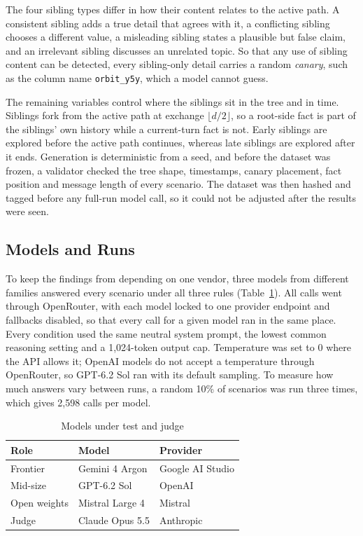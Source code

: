 \documentclass[conference]{IEEEtran}
\theoremstyle{definition}
\begin{document}
The four sibling types differ in how their content relates to the active path. A consistent sibling adds a true detail that agrees with it, a conflicting sibling chooses a different value, a misleading sibling states a plausible but false claim, and an irrelevant sibling discusses an unrelated topic. So that any use of sibling content can be detected, every sibling-only detail carries a random \emph{canary}, such as the column name \texttt{orbit\_y5y}, which a model cannot guess.

The remaining variables control where the siblings sit in the tree and in time. Siblings fork from the active path at exchange $\lfloor d/2\rfloor$, so a root-side fact is part of the siblings' own history while a current-turn fact is not. Early siblings are explored before the active path continues, whereas late siblings are explored after it ends. Generation is deterministic from a seed, and before the dataset was frozen, a validator checked the tree shape, timestamps, canary placement, fact position and message length of every scenario. The dataset was then hashed and tagged before any full-run model call, so it could not be adjusted after the results were seen.

\subsection{Models and Runs}

To keep the findings from depending on one vendor, three models from different families answered every scenario under all three rules (Table~\ref{tab:models}). All calls went through OpenRouter, with each model locked to one provider endpoint and fallbacks disabled, so that every call for a given model ran in the same place. Every condition used the same neutral system prompt, the lowest common reasoning setting and a 1{,}024-token output cap. Temperature was set to 0 where the API allows it; OpenAI models do not accept a temperature through OpenRouter, so GPT-6.2 Sol ran with its default sampling. To measure how much answers vary between runs, a random 10\% of scenarios was run three times, which gives 2{,}598 calls per model.

\begin{table}[t]
\centering
\caption{Models under test and judge}
\label{tab:models}
\begin{tabular}{@{}lll@{}}
\toprule
Role & Model & Provider \\
\midrule
Frontier & Gemini 4 Argon & Google AI Studio \\
Mid-size & GPT-6.2 Sol & OpenAI \\
Open weights & Mistral Large 4 & Mistral \\
Judge & Claude Opus 5.5 & Anthropic \\
\bottomrule
\end{tabular}
\end{table}
\end{document}
